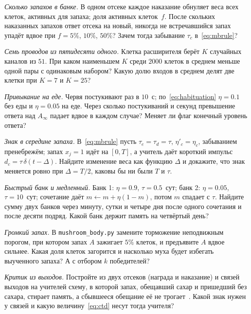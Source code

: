 \begin{exercise}[\lvlA]
\label{ex:23:1}
\emph{Сколько запахов в банке.} В одном отсеке каждое наказание обнуляет веса всех клеток, активных для запаха; доля активных клеток~$f$. После скольких наказанных запахов ответ отсека на новый, никогда не встречавшийся запах упадёт вдвое при $f=5\%$, $10\%$, $50\%$? Зачем тогда забывание $\tau_c$ в~\eqref{eq:mbrule}?
\end{exercise}

\begin{exercise}[\lvlA]
\label{ex:23:2}
\emph{Семь проводов из пятидесяти одного.} Клетка расширителя берёт $K$ случайных каналов из $51$. При каком наименьшем $K$ среди $2000$ клеток в среднем меньше одной пары с одинаковым набором? Какую долю входов в среднем делят две клетки при $K=7$ и $K=25$?
\end{exercise}

\begin{exercise}[\lvlA]
\label{ex:23:3}
\emph{Привыкание на еде.} Червя постукивают раз в $10$~с; по~\eqref{eq:habituation} $\eta=0.1$ без еды и $\eta=0.05$ на еде. Через сколько постукиваний и секунд превышение ответа над $A_\infty$ падает вдвое в каждом случае? Меняет ли флаг конечный уровень ответа?
\end{exercise}

\begin{exercise}[\lvlB]
\label{ex:23:4}
\emph{Знак в середине запаха.} В~\eqref{eq:mbrule} пусть $\tau_e=\tau_d=\tau$, $\eta'_c=\eta_c$, забыванием пренебрежём; запах $x_j=1$ идёт на $[0,T]$, а учитель даёт короткий импульс $d_c=\tau\,\delta(t-\Delta)$. Найдите изменение веса как функцию $\Delta$ и докажите, что знак меняется ровно при $\Delta=T/2$, каковы бы ни были $T$ и $\tau$.
\end{exercise}

\begin{exercise}[\lvlB]
\label{ex:23:5}
\emph{Быстрый банк и медленный.} Банк 1: $\eta=0.9$, $\tau=0.5$~сут; банк 2: $\eta=0.05$, $\tau=10$~сут; сочетание даёт $m\leftarrow m+\eta(1-m)$, потом $m$ спадает с $\tau$. Найдите сумму двух банков через минуту, сутки и четыре дня после одного сочетания и после десяти подряд. Какой банк держит память на четвёртый день?
\end{exercise}

\begin{exercise}[\lvlB]
\label{ex:23:6}
\emph{Громкий запах.} В \texttt{mushroom\_body.py} замените торможение неподвижным порогом, при котором запах $A$ зажигает $5\%$ клеток, и предъявите $A$ вдвое сильнее. Какая доля клеток загорится и насколько муха будет избегать выученного запаха? А с отбором $k$ победителей?
\end{exercise}

\begin{exercise}[\lvlC]
\label{ex:23:7}
\emph{Критик из выходов.} Постройте из двух отсеков (награда и наказание) и связей выходов на учителей схему, в которой запах, обещавший сахар и пришедший без сахара, стирает память, а сбывшееся обещание её не трогает~\cite{Felsenberg2017}. Какой знак нужен у связей и какую величину~\eqref{eq:ctd} несут тогда учителя?
\end{exercise}
